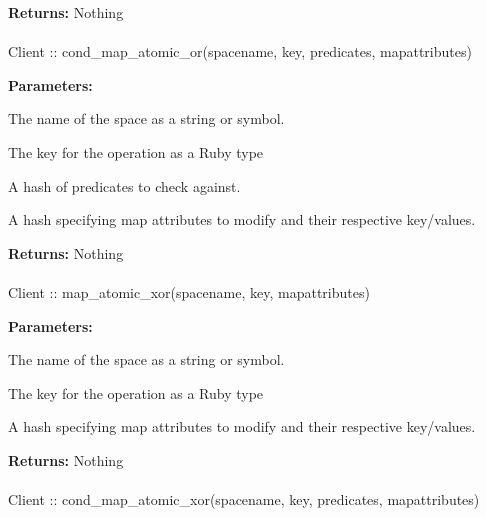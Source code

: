\noindent\textbf{Returns:}
Nothing

\paragraph{}
\begin{ccode}
Client :: cond_map_atomic_or(spacename, key, predicates, mapattributes)
\end{ccode}
\funcdesc 

\noindent\textbf{Parameters:}
\begin{description}[labelindent=\widthof{{mapattributes}},leftmargin=*,noitemsep,nolistsep,align=right]
\item[spacename] The name of the space as a string or symbol.
\item[key] The key for the operation as a Ruby type
\item[predicates] A hash of predicates to check against.
\item[mapattributes] A hash specifying map attributes to modify and their respective key/values.
\end{description}

\noindent\textbf{Returns:}
Nothing

\paragraph{}
\begin{ccode}
Client :: map_atomic_xor(spacename, key, mapattributes)
\end{ccode}
\funcdesc 

\noindent\textbf{Parameters:}
\begin{description}[labelindent=\widthof{{mapattributes}},leftmargin=*,noitemsep,nolistsep,align=right]
\item[spacename] The name of the space as a string or symbol.
\item[key] The key for the operation as a Ruby type
\item[mapattributes] A hash specifying map attributes to modify and their respective key/values.
\end{description}

\noindent\textbf{Returns:}
Nothing

\paragraph{}
\begin{ccode}
Client :: cond_map_atomic_xor(spacename, key, predicates, mapattributes)
\end{ccode}
\funcdesc 


